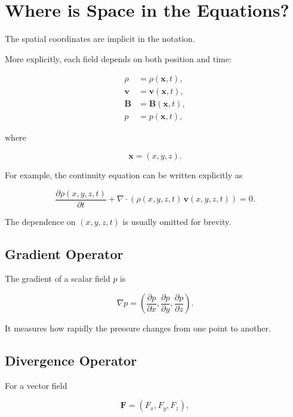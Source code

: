 \documentclass[12pt]{article}
\begin{document}
\section{Where is Space in the Equations?}

The spatial coordinates are implicit in the notation.

More explicitly, each field depends on both position and time:

\begin{align}
\rho &= \rho(\mathbf{x},t),
\\
\mathbf{v} &= \mathbf{v}(\mathbf{x},t),
\\
\mathbf{B} &= \mathbf{B}(\mathbf{x},t),
\\
p &= p(\mathbf{x},t),
\end{align}

where

\begin{equation}
\mathbf{x}=(x,y,z).
\end{equation}

For example, the continuity equation can be written explicitly as

\begin{equation}
\frac{\partial \rho(x,y,z,t)}{\partial t}
+
\nabla\cdot
\left(
\rho(x,y,z,t)\,
\mathbf{v}(x,y,z,t)
\right)
=
0.
\end{equation}

The dependence on $(x,y,z,t)$ is usually omitted for brevity.

\subsection{Gradient Operator}

The gradient of a scalar field $p$ is

\begin{equation}
\nabla p
=
\left(
\frac{\partial p}{\partial x},
\frac{\partial p}{\partial y},
\frac{\partial p}{\partial z}
\right).
\end{equation}

It measures how rapidly the pressure changes from one point to another.

\subsection{Divergence Operator}

For a vector field

\[
\mathbf{F}
=
(F_x,F_y,F_z),
\]
\end{document}
